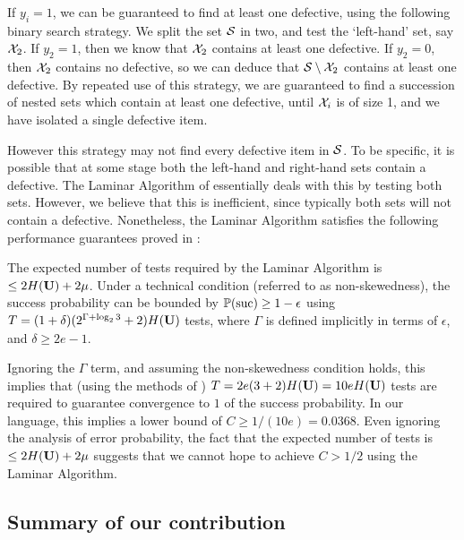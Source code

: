 If $y_i = 1$, we can be guaranteed to find at least
one defective, using the following binary search strategy.  
We  split the   set ${\mathcal{S}}$ in two, and test the `left-hand' set, say ${\mathcal{X}}_{2}$. If $y_{2} = 1$, then we know that ${\mathcal{X}}_{2}$ contains at least one defective.
If $y_{2} = 0$, then ${\mathcal{X}}_{2}$ contains no defective, so we can deduce that ${\mathcal{S}} \setminus {\mathcal{X}}_2$ contains at least one defective. By repeated use of this strategy, we are 
guaranteed to find a succession of nested sets which contain at least one defective, until ${\mathcal{X}}_i$ is of size 1, and we have isolated a single defective item.

However this strategy may not find every defective item in ${\mathcal{S}}$. To be specific, it is possible that at some stage
both the left-hand and right-hand sets contain a defective. The Laminar Algorithm of \cite{li5} essentially deals with this by testing 
both sets. However, we believe that this is inefficient, since typically both sets will not contain a defective. Nonetheless, the Laminar Algorithm satisfies
 the following  performance guarantees  proved in \cite[Theorem 2]{li5}: 
%
\begin{theorem} \label{thm:lower}
The expected number of tests required by the Laminar Algorithm \cite{li5}  is $\leq 2 H({\mathbf{ U}}) + 2 \mu$. Under a technical condition (referred to as non-skewedness), the
success probability can be bounded by ${\mathbb{P}}({\mathrm{suc}}) \geq 1- \epsilon$ using $T = (1+ \delta) (2^{\Gamma + \log_2 3} + 2) H({\mathbf{ U}})$ tests, where $\Gamma$ is defined implicitly
in terms of $\epsilon$, and $\delta \geq 2 e - 1$.
\end{theorem}

Ignoring the $\Gamma$ term, and assuming the non-skewedness condition holds,
 this implies that (using the methods of \cite{li5}) $T =  2 e (3 + 2) H({\mathbf{ U}}) = 10 e H({\mathbf{ U}})$ tests are required to guarantee convergence to $1$
of the success probability. In our language, this implies a lower bound of $C \geq 1/(10 e) = 0.0368$. Even ignoring the analysis of error probability, the fact that the expected number
of tests is $\leq 2 H({\mathbf{ U}}) + 2 \mu$ suggests that we cannot hope to achieve $C > 1/2$ using the Laminar Algorithm.
%
\subsection{Summary of our contribution} \label{sec:algo}

